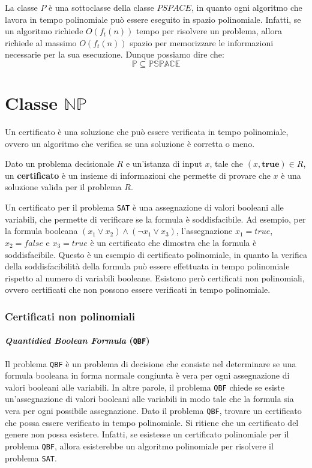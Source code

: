     La classe $P$ è una sottoclasse della classe $PSPACE$, in quanto ogni algoritmo che lavora in tempo polinomiale può essere eseguito in spazio polinomiale. Infatti, se un algoritmo richiede $O(f_t(n))$ tempo per risolvere un problema, allora richiede al massimo $O(f_t(n))$ spazio per memorizzare le informazioni necessarie per la sua esecuzione. Dunque possiamo dire che:
    $$
        \mathbb{P}\subseteq\mathbb{PSPACE}
    $$

\section{\texorpdfstring{Classe $\mathbb{NP}$}{Classe NP}}
    Un certificato è una soluzione che può essere verificata in tempo polinomiale, ovvero un algoritmo che verifica se una soluzione è corretta o meno.
    \begin{definition}[Certificato]
        Dato un problema decisionale $R$ e un'istanza di input $x$, tale che $(x,\textbf{true})\in R$, un \textbf{certificato} è un insieme di informazioni che permette di provare che $x$ è una soluzione valida per il problema $R$.
    \end{definition}
    Un certificato per il problema \texttt{SAT} è una assegnazione di valori booleani alle variabili, che permette di verificare se la formula è soddisfacibile. Ad esempio, per la formula booleana $(x_1\lor x_2)\land(\neg x_1\lor x_3)$, l'assegnazione $x_1=true$, $x_2=false$ e $x_3=true$ è un certificato che dimostra che la formula è soddisfacibile. Questo è un esempio di certificato polinomiale, in quanto la verifica della soddisfacibilità della formula può essere effettuata in tempo polinomiale rispetto al numero di variabili booleane. Esistono però certificati non polinomiali, ovvero certificati che non possono essere verificati in tempo polinomiale. 
    \subsubsection{Certificati non polinomiali}
        \paragraph{\textit{Quantidied Boolean Formula} (\texttt{QBF})}
            Il problema \texttt{QBF} è un problema di decisione che consiste nel determinare se una formula booleana in forma normale congiunta è vera per ogni assegnazione di valori booleani alle variabili. In altre parole, il problema \texttt{QBF} chiede se esiste un'assegnazione di valori booleani alle variabili in modo tale che la formula sia vera per ogni possibile assegnazione.
        \newline
        Dato il problema \texttt{QBF}, trovare un certificato che possa essere verificato in tempo polinomiale.\newline
        Si ritiene che un certificato del genere non possa esistere. Infatti, se esistesse un certificato polinomiale per il problema \texttt{QBF}, allora esisterebbe un algoritmo polinomiale per risolvere il problema \texttt{SAT}.
